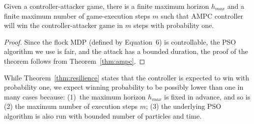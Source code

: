 

%
%
%

\begin{theorem}
\label{thm:resilience}
Given a controller-attacker game, there is a finite maximum horizon $h_{\mathit{max}}$ and a finite maximum number of game-execution steps $m$ such that AMPC controller will win the controller-attacker game in $m$ steps with probability one.
\end{theorem}

\begin{proof}
Since the flock MDP (defined by Equation~6) is controllable, the PSO algorithm we use is fair, and the attack has a bounded duration, the proof of the theorem follows from Theorem~\ref{thm:ampc}. 
\end{proof}

\begin{remark}
While Theorem~\ref{thm:resilience} states that the controller is expected to win with probability one, we expect winning probability to be possibly lower than one in many cases because: (1)~the maximum horizon $h_{\mathit{max}}$ is fixed in advance, and so is (2) the maximum number of execution steps $m$; (3) the underlying PSO algorithm is also run with bounded number of particles and time.
\end{remark}
